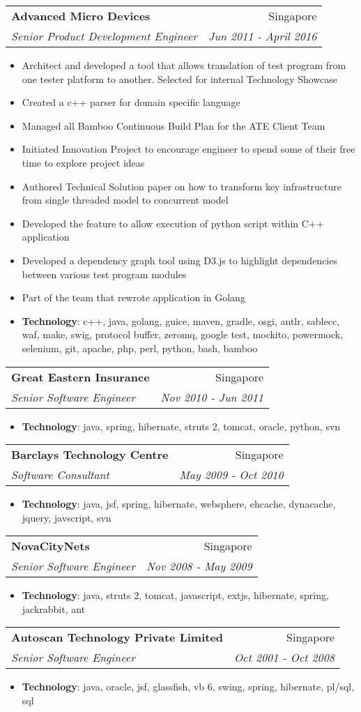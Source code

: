 \documentclass[letterpaper,11pt]{article}
\makeatletter
\newcommand{\resumeItem}[2]{
  \item\small{
    \textbf{#1}{: #2 \vspace{-2pt}}
  }
}
\newcommand{\resumeSubheading}[4]{
  \vspace{-1pt}\item
    \begin{tabular*}{0.97\textwidth}[t]{l@{\extracolsep{\fill}}r}
      \textbf{#1} & #2 \\
      \textit{\small#3} & \textit{\small #4} \\
    \end{tabular*}\vspace{-5pt}
}
\newcommand{\resumeSingleLine}[1]{
  \item\small{
     {#1}
  }
}
\newcommand{\resumeSingleLineWithBold}[2]{
  \item\small{
    \textbf{#1}{: #2 \vspace{-2pt}}
  }
}
\newcommand{\resumeSubHeadingListStart}{\begin{itemize}[leftmargin=*]}
\newcommand{\resumeSubHeadingListEnd}{\end{itemize}}
\newcommand{\resumeItemListStart}{\begin{itemize}}
\newcommand{\resumeItemListEnd}{\end{itemize}\vspace{-5pt}}
\makeatother
\begin{document}
    \resumeSubheading
      {Advanced Micro Devices}{Singapore}
      {Senior Product Development Engineer}{Jun 2011 - April 2016}
      \resumeSubHeadingListStart
       \resumeSingleLine
       {Architect and developed a tool that allows translation of test program from one tester platform to another. Selected for internal Technology Showcase}
       \resumeSingleLine
       {Created a c++ parser for domain specific language}
       \resumeSingleLine
       {Managed all Bamboo Continuous Build Plan for the ATE Client Team}
       \resumeSingleLine
       {Initiated Innovation Project to encourage engineer to spend some of their free time to explore project ideas}
       \resumeSingleLine
       {Authored Technical Solution paper on how to transform key infrastructure from single threaded model to concurrent model}
       \resumeSingleLine
       {Developed the feature to allow execution of python script within C++ application}
       \resumeSingleLine
       {Developed a dependency graph tool using D3.js to highlight dependencies between various test program modules}
       \resumeSingleLine
       {Part of the team that rewrote application in Golang}
      \resumeSingleLineWithBold{Technology}
       {c++, java, golang, guice, maven, gradle, osgi, antlr, sablecc, waf, make, swig, protocol buffer, zeromq, google test, mockito, powermock, selenium, git, apache, php, perl, python, bash, bamboo }
      \resumeSubHeadingListEnd

    \resumeSubheading
      {Great Eastern Insurance}{Singapore}
      {Senior Software Engineer}{Nov 2010 - Jun 2011}
      \resumeItemListStart
        \resumeItem{Technology}
        {java, spring, hibernate, struts 2, tomcat, oracle, python, svn }
      \resumeItemListEnd


    \resumeSubheading
      {Barclays Technology Centre}{Singapore}
      {Software Consultant}{May 2009 - Oct 2010}
      \resumeItemListStart
        \resumeItem{Technology}
        {java, jsf, spring, hibernate, websphere, ehcache, dynacache, jquery, javscript, svn }
      \resumeItemListEnd


    \resumeSubheading
      {NovaCityNets}{Singapore}
      {Senior Software Engineer}{Nov 2008 - May 2009}
      \resumeItemListStart
        \resumeItem{Technology}
        {java, struts 2, tomcat, javascript, extjs, hibernate, spring, jackrabbit, ant }
      \resumeItemListEnd


    \resumeSubheading
      {Autoscan Technology Private Limited}{Singapore}
      {Senior Software Engineer}{Oct 2001 - Oct 2008}
      \resumeItemListStart
        \resumeItem{Technology}
        {java, oracle, jsf, glassfish, vb 6, swing, spring, hibernate, pl/sql, sql }
      \resumeItemListEnd
\end{document}
